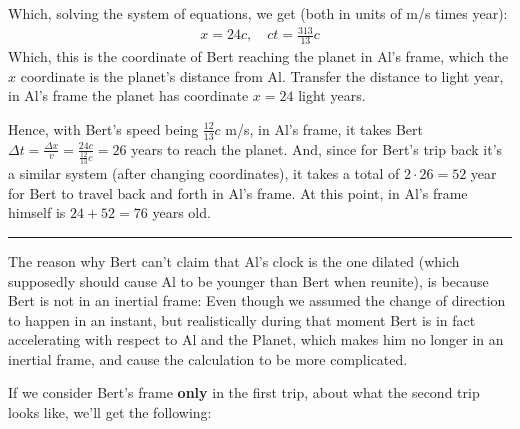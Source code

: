 \documentclass{article}
\begin{document}
Which, solving the system of equations, we get (both in units of m/s times year):
\begin{align}
    x= 24c,\quad ct = \frac{313}{13}c
\end{align}
Which, this is the coordinate of Bert reaching the planet in Al's frame, which the $x$ coordinate is the planet's distance from Al. Transfer the distance to light year, in Al's frame the planet has coordinate $x=24$ light years.

Hence, with Bert's speed being $\frac{12}{13}c$ m/s, in Al's frame, it takes Bert $\Delta t = \frac{\Delta x}{v} = \frac{24c}{\frac{12}{13}c} = 26$ years to reach the planet. And, since for Bert's trip back it's a similar system (after changing coordinates), it takes a total of $2\cdot 26 = 52$ year for Bert to travel back and forth in Al's frame. At this point, in Al's frame himself is $24 + 52 = 76$ years old.

\rule{15.6cm}{0.1mm}

The reason why Bert can't claim that Al's clock is the one dilated (which supposedly should cause Al to be younger than Bert when reunite), is because Bert is not in an inertial frame: Even though we assumed the change of direction to happen in an instant, but realistically during that moment Bert is in fact accelerating with respect to Al and the Planet, which makes him no longer in an inertial frame, and cause the calculation to be more complicated.

If we consider Bert's frame \textbf{only} in the first trip, about what the second trip looks like, we'll get the following: 
\end{document}
